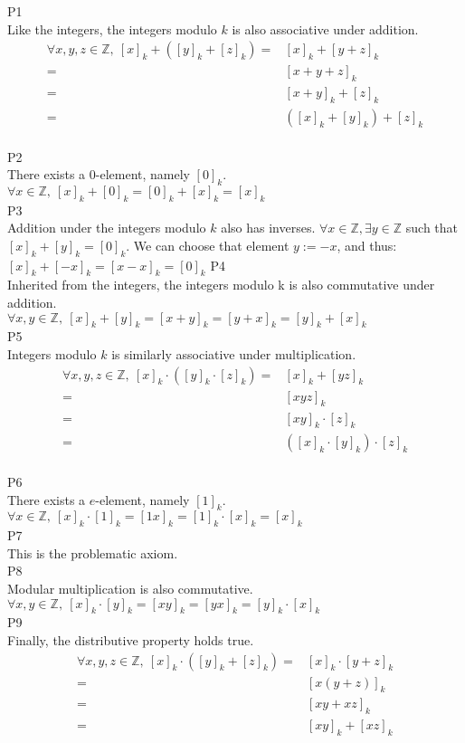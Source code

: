 \documentclass[11pt]{article}
\begin{document}
\begin{flushleft}
P1 \\
Like the integers, the integers modulo $k$ is also associative under addition.
\begin{align*}
\forall x,y,z \in \mathbb{Z}, \ [x]_k + ([y]_k + [z]_k) = & [x]_k + [y+z]_k \\
= & [x+y+z]_k \\
= & [x+y]_k + [z]_k \\
= & ([x]_k + [y]_k) + [z]_k
\end{align*} \\
\bigskip
P2 \\
There exists a 0-element, namely $[0]_k$. \\
$\forall x \in \mathbb{Z}, \ [x]_k+[0]_k = [0]_k + [x]_k = [x]_k$ \\
\bigskip
P3 \\
Addition under the integers modulo $k$ also has inverses.
$\forall x \in \mathbb{Z},\exists y \in \mathbb{Z}$ such that $[x]_k + [y]_k = [0]_k$. We can choose that element $y := -x$, and thus: $[x]_k + [-x]_k = [x-x]_k = [0]_k$
\bigskip
P4 \\
Inherited from the integers, the integers modulo k is also commutative under addition. \\
$\forall x,y \in \mathbb{Z}, \ [x]_k+[y]_k = [x+y]_k = [y+x]_k = [y]_k+[x]_k$ \\
\bigskip
P5 \\
Integers modulo $k$ is similarly associative under multiplication.
\begin{align*}
\forall x,y,z \in \mathbb{Z}, \ [x]_k \cdot ([y]_k \cdot [z]_k) = & [x]_k + [yz]_k \\
= & [xyz]_k \\
= & [xy]_k \cdot [z]_k \\
= & ([x]_k \cdot [y]_k) \cdot [z]_k
\end{align*} \\
\bigskip
P6 \\
There exists a $e$-element, namely $[1]_k$. \\
$\forall x \in \mathbb{Z}, \ [x]_k \cdot [1]_k = [1x]_k = [1]_k \cdot [x]_k = [x]_k$ \\
\bigskip
P7 \\
This is the problematic axiom. \\
\bigskip
P8 \\
Modular multiplication is also commutative. \\
$\forall x,y \in \mathbb{Z}, \ [x]_k \cdot [y]_k = [xy]_k = [yx]_k = [y]_k \cdot [x]_k$ \\
\bigskip
P9 \\
Finally, the distributive property holds true.
\begin{align*}
\forall x,y,z \in \mathbb{Z}, \ [x]_k \cdot ([y]_k + [z]_k) = & [x]_k \cdot [y+z]_k \\
= & [x(y+z)]_k \\
= & [xy + xz]_k \\
= & [xy]_k + [xz]_k
\end{align*}


\end{flushleft}
\end{document}
